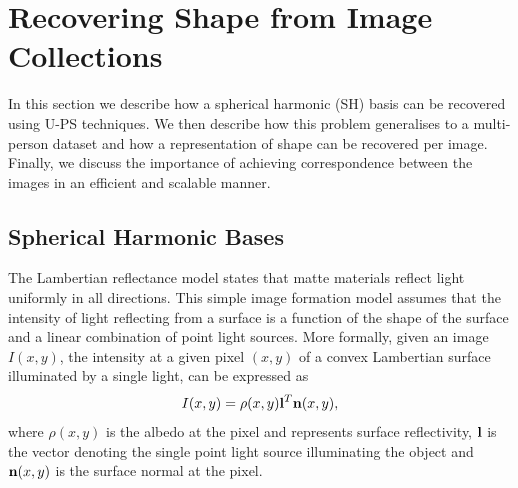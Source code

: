 \section{Recovering Shape from Image Collections}\label{sec:imag_coll_problem}
In this section we describe how a spherical harmonic (SH) basis can be recovered
using U-PS techniques. We then describe how this
problem generalises to a multi-person dataset and how a representation of shape
can be recovered per image. Finally, we discuss the importance of achieving
correspondence between the images in an efficient and scalable manner.
\subsection{Spherical Harmonic Bases}\label{subsec:imag_coll_spherical_harmonic}
The Lambertian reflectance model states that matte materials reflect light
uniformly in all directions. This simple image formation model assumes that the
intensity of light reflecting from a surface is a function of the shape of the
surface and a linear combination of point light sources. More formally, given an
image $I(x, y)$, the intensity at a given pixel $(x, y)$ of a convex Lambertian
surface illuminated by a single light, can be expressed as
\begin{equation}\label{eq:lambert_law}
    I(x, y) = \rho(x, y) \boldsymbol{\mathbf{l}}^T \boldsymbol{\mathbf{n}}(x, y),
\end{equation}
where $\rho(x, y)$ is the albedo at the pixel and represents surface
reflectivity, $\boldsymbol{\mathbf{l}}$ is the vector denoting the single point light source
illuminating the object and $\boldsymbol{\mathbf{n}}(x, y)$ is the surface normal at the
pixel.


